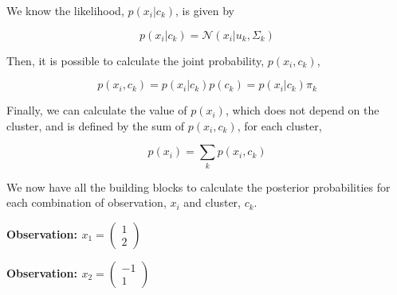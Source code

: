 \documentclass[12pt]{article}
\begin{document}
\begin{enumerate}[leftmargin=\labelsep]
          We know the likelihood, $p(x_i|c_k)$, is given by

          \begin{equation}\label{ex1-likelihood}
              p(x_i|c_k) = \mathcal{N}(x_i|u_{k}, \Sigma_{k})
          \end{equation}

          Then, it is possible to calculate the joint probability, $p(x_i, c_k)$,

          \begin{equation}\label{ex1-joint}
              p(x_i,c_k) = p(x_i|c_k)p(c_k) = p(x_i|c_k) \pi_k
          \end{equation}

          Finally, we can calculate the value of $p(x_i)$, which does not depend
          on the cluster, and is defined by the sum of $p(x_i, c_k)$, for each cluster,

          \begin{equation}\label{ex1-sum-joint}
              p(x_i) = \sum_k p(x_i, c_k)
          \end{equation}

          We now have all the building blocks to calculate the posterior probabilities
          for each combination of observation, $x_i$ and cluster, $c_k$.

          \vspace*{0.5cm}

          \begin{paracol}{3}
              \begin{center}
                  \textbf{Observation: \textcolor{cred}{$x_1 = \begin{pmatrix}
                                  1 \\
                                  2
                              \end{pmatrix}$}}
              \end{center}

              \switchcolumn

              \begin{center}
                  \textbf{Observation: \textcolor{cblue}{$x_2 = \begin{pmatrix}
                                  -1 \\
                                  1
                              \end{pmatrix}$}}
              \end{center}


\end{paracol}
\end{enumerate}
\end{document}
